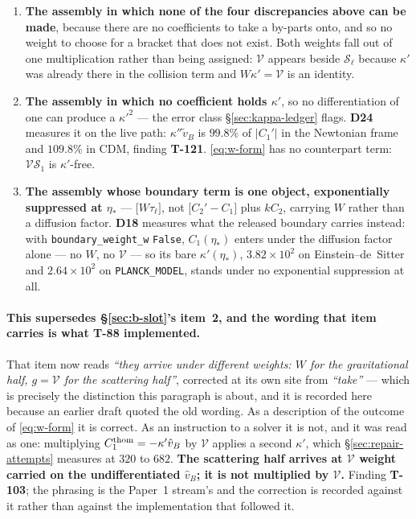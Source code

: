 \begin{enumerate}\itemsep3pt
\item \textbf{The assembly in which none of the four discrepancies above
      can be made}, because there are no coefficients to take a by-parts onto,
      and so no weight to choose for a bracket that does not exist. Both weights fall out of one multiplication rather than being
      assigned: $\mathcal V$ appears beside $\mathcal S_\ell$ because $\kappa'$
      was already there in the collision term and $W\kappa'=\mathcal V$ is an
      identity.
\item \textbf{The assembly in which no coefficient holds $\kappa'$}, so no
      differentiation of one can produce a $\kappa'^2$ --- the error class
      \S\ref{sec:kappa-ledger} flags. \textbf{D24} measures it on the live
      path: $\kappa''\tilde v_B$ is $99.8\%$ of $|C_1'|$ in the Newtonian
      frame and $109.8\%$ in CDM, finding \textbf{T-121}.
      \eqref{eq:w-form} has no counterpart term: $\mathcal V\mathcal S_1$ is
      $\kappa'$-free.
\item \textbf{The assembly whose boundary term is one object, exponentially
      suppressed at $\eta_*$} --- $\big[W\tau_\ell\big]$, not
      $\big[C_2'-C_1\big]$ plus $kC_2$, carrying $W$ rather than a diffusion
      factor. \textbf{D18} measures what the released boundary carries instead:
      with \texttt{boundary\_weight\_w} \texttt{False}, $C_1(\eta_*)$ enters
      under the diffusion factor alone --- no $W$, no $\mathcal V$ --- so its
      bare $\kappa'(\eta_*)$, $3.82\times10^2$ on Einstein--de~Sitter and
      $2.64\times10^2$ on \texttt{PLANCK\_MODEL}, stands under no exponential
      suppression at all.
\end{enumerate}

\paragraph{This supersedes \S\ref{sec:b-slot}'s item~2, and the wording that
item carries is what \textbf{T-88} implemented.} That item now reads \emph{``they
\emph{arrive under} different weights: $W$ for the gravitational half,
$g=\mathcal V$ for the scattering half''}, corrected at its own site from
\emph{``take''} --- which is precisely the distinction this paragraph is
about, and it is recorded here because an earlier draft quoted the old
wording. As a description of the outcome of \eqref{eq:w-form} it is
correct. As an instruction to a solver it is not, and it was read as one:
multiplying $C_1^{\rm thom}=-\kappa'\hat v_B$ by $\mathcal V$ applies a second
$\kappa'$, which \S\ref{sec:repair-attempts} measures at $320$ to $682$.
\textbf{The scattering half arrives at $\mathcal V$ weight carried on the
undifferentiated $\hat v_B$; it is not multiplied by $\mathcal V$.} Finding
\textbf{T-103}; the phrasing is the Paper~1 stream's and the correction is
recorded against it rather than against the implementation that followed it.

